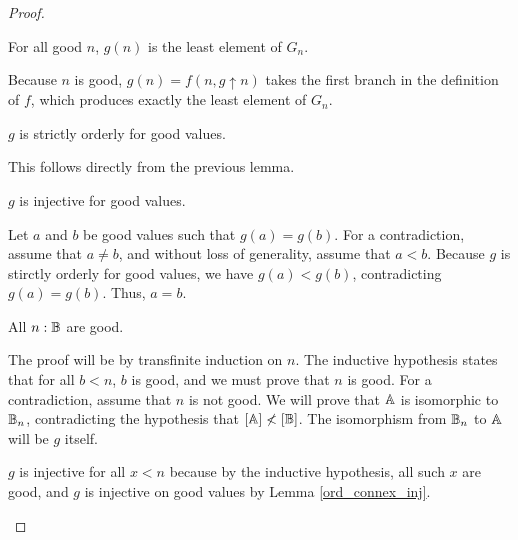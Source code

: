 \documentclass[../../math.tex]{subfiles}
\begin{document}
\begin{proof}
    \begin{lemma} \label{ord_connex_least}
        For all good $n$, $g(n)$ is the least element of $G_n$.
    \end{lemma}
    \begin{subproof}
        Because $n$ is good, $g(n) = f(n, g \uparrow n)$ takes the first branch
        in the definition of $f$, which produces exactly the least element of
        $G_n$.
    \end{subproof}

    \begin{lemma} \label{ord_connex_preserve}
        $g$ is strictly orderly for good values.
    \end{lemma}
    \begin{subproof}
        This follows directly from the previous lemma.
    \end{subproof}

    \begin{lemma} \label{ord_connex_inj}
        $g$ is injective for good values.
    \end{lemma}
    \begin{subproof}
        Let $a$ and $b$ be good values such that $g(a) = g(b)$.  For a
        contradiction, assume that $a \neq b$, and without loss of generality,
        assume that $a < b$.  Because $g$ is stirctly orderly for good values,
        we have $g(a) < g(b)$, contradicting $g(a) = g(b)$.  Thus, $a = b$.
    \end{subproof}

    \begin{lemma} \label{ord_connex_all_good}
        All $n : \mathbb{B}$ are good.
    \end{lemma}
    \begin{subproof}
        The proof will be by transfinite induction on $n$.  The inductive
        hypothesis states that for all $b < n$, $b$ is good, and we must prove
        that $n$ is good.  For a contradiction, assume that $n$ is not good.  We
        will prove that $\mathbb{A}$ is isomorphic to $\mathbb{B}_n$, contradicting the
        hypothesis that $[\mathbb{A}] \nless [\mathbb{B}]$.  The isomorphism from $\mathbb{B}_n$ to $\mathbb{A}$
        will be $g$ itself.

        $g$ is injective for all $x < n$ because by the inductive hypothesis,
        all such $x$ are good, and $g$ is injective on good values by Lemma
        \ref{ord_connex_inj}.


\end{subproof}
\end{proof}
\end{document}
